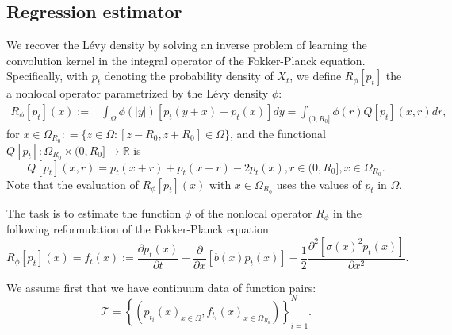 \documentclass[12pt]{article}
\def\R{\mathbb{R}}
\numberwithin{equation}{section}
\numberwithin{theorem}{section}
\begin{document}
\subsection{Regression estimator} 
We recover the L\'evy density by solving an inverse problem of learning the convolution kernel in the integral operator of the Fokker-Planck equation. Specifically, with $p_t$ denoting the probability density of $X_t$, we define $ R_\phi[p_t]$ the a nonlocal operator parametrized by the L\'evy density $\phi$: 
\begin{equation}
\label{eq:nonop}
\begin{aligned}
R_{\phi}[p_t](x):=&\int_{\Omega} \phi(|y|)[p_t(y+x)-p_t(x)] d y =  \int_{(0,R_0]} \phi(r)Q[p_t](x, r) d r, 
\end{aligned}
\end{equation}
for $x\in \Omega_{R_0}: = \{z\in \Omega: [z-R_0,z+R_0]\in \Omega \}$, and the functional $Q[p_t]:\Omega_{R_0}\times (0,R_0]\to \R$ is 
\begin{equation}
\label{eq:Q[p]}
Q[p_t](x, r) = p_t(x + r) + p_t(x - r)- 2p_t(x), r\in (0,R_0], x\in \Omega_{R_0}. 
\end{equation}
Note that the evaluation of $R_\phi[p_t](x)$ with $x\in \Omega_{R_0}$ uses the values of $p_t$ in $\Omega$.

The task is to estimate the function $\phi$ of the nonlocal operator $R_\phi$ in the following reformulation of the Fokker-Planck equation 
\begin{equation}
   \label{eq:fdata} 
 R_\phi[p_t](x) = f_t(x):= \frac{\partial p_t(x)}{\partial t}+ \frac{\partial}{\partial x}\left[b(x) p_t(x)\right]- \frac{1}{2} \frac{\partial^2 \left[\sigma(x)^2p_t(x)\right]}{\partial x^2}.  
\end{equation}

 We assume first that we have continuum data of function pairs:
\begin{equation}
\label{eq:densitydata}
\mathcal{T}=\left\{\left(p_{t_i}(x)_{x\in \Omega}, f_{t_i}(x) _ {x\in \Omega_{R_0} }\right)  \right\}_{i=1}^N.  %
\end{equation} 
\end{document}
